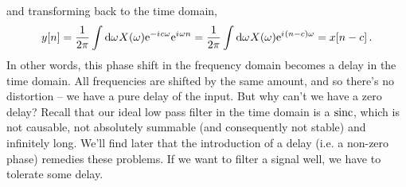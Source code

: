 %
and transforming back to the time domain,
%
\begin{displaymath}
  y[n] = \frac{1}{2\pi}\int\mathrm{d}\omega\mkern1muX(\omega)\mathrm{e}^{-{i\mkern1mu} c\omega}\mathrm{e}^{{i\mkern1mu}\omega n}
  = \frac{1}{2\pi}\int\mathrm{d}\omega\mkern1muX(\omega)\mathrm{e}^{{i\mkern1mu}(n - c)\omega} = x[n-c] \,.
\end{displaymath}
%
In other words, this phase shift in the frequency domain becomes a delay in
the time domain. All frequencies are shifted by the same amount, and
so there's no distortion -- we have a pure delay of the input. But why can't we
have a zero delay? Recall that our ideal low pass filter in the time domain is
a $\operatorname{sinc}$, which is not causable, not absolutely summable (and consequently
not stable) and infinitely long. We'll find later that the introduction of a
delay (i.e. a non-zero phase) remedies these problems. If we want to filter
a signal well, we have to tolerate some delay.
